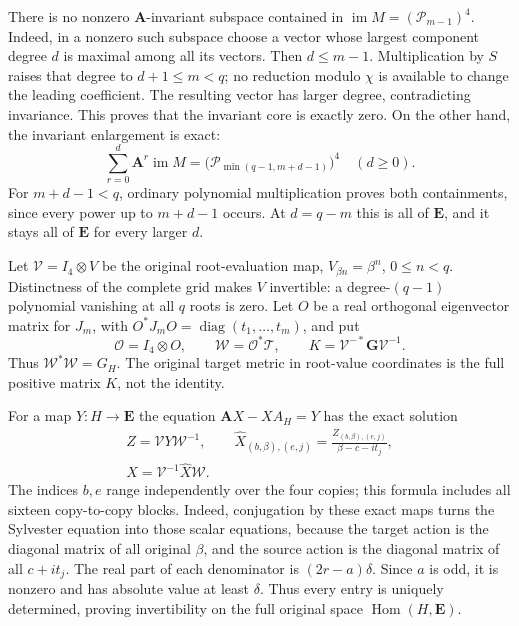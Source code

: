 There is no nonzero \(\mathbf A\)-invariant subspace contained in
\(\operatorname{im}M=(\mathcal P_{m-1})^4\).
Indeed, in a nonzero such subspace choose a vector whose largest
component degree \(d\) is maximal among all its vectors.
Then \(d\leq m-1\).
Multiplication by \(S\) raises that degree to \(d+1\leq m<q\);
no reduction modulo \(\chi\) is available to change the leading
coefficient.
The resulting vector has larger degree, contradicting invariance.
This proves that the invariant core is exactly zero.
On the other hand, the invariant enlargement is exact:
\begin{equation}
 \sum_{r=0}^{d}\mathbf A^r\operatorname{im}M
   =\bigl(\mathcal P_{\min(q-1,m+d-1)}\bigr)^4
 \quad(d\geq0).
 \tag{CJA25}
\end{equation}
For \(m+d-1<q\), ordinary polynomial multiplication proves both
containments, since every power up to \(m+d-1\) occurs.
At \(d=q-m\) this is all of \(\mathbf E\), and it stays all of
\(\mathbf E\) for every larger \(d\).

Let \(\mathcal V=I_4\otimes V\) be the original root-evaluation
map, \(V_{\beta n}=\beta^n\), \(0\leq n<q\).
Distinctness of the complete grid makes \(V\) invertible: a
degree-\((q-1)\) polynomial vanishing at all \(q\) roots is zero.
Let \(O\) be a real orthogonal eigenvector matrix for \(J_m\),
with \(O^*J_mO=\operatorname{diag}(t_1,\ldots,t_m)\), and put
\[
 \mathcal O=I_4\otimes O,\qquad
 \mathcal W=\mathcal O^*\mathcal T,\qquad
 K=\mathcal V^{-*}\mathbf G\mathcal V^{-1}.
 \]
Thus \(\mathcal W^*\mathcal W=G_H\).
The original target metric in root-value coordinates is the full
positive matrix \(K\), not the identity.

For a map \(Y:H\to\mathbf E\) the equation
\(\mathbf AX-XA_H=Y\) has the exact solution
\begin{equation}
 \begin{gathered}
 Z=\mathcal VY\mathcal W^{-1},\qquad
 \widehat X_{(b,\beta),(e,j)}
   =\frac{Z_{(b,\beta),(e,j)}}{\beta-c-it_j},\\
 X=\mathcal V^{-1}\widehat X\mathcal W .
 \end{gathered}
 \tag{CJA26}
\end{equation}
The indices \(b,e\) range independently over the four copies;
this formula includes all sixteen copy-to-copy blocks.
Indeed, conjugation by these exact maps turns the Sylvester equation
into those scalar equations, because the target action is the
diagonal matrix of all original \(\beta\), and the source action is
the diagonal matrix of all \(c+it_j\).
The real part of each denominator is \((2r-a)\delta\).
Since \(a\) is odd, it is nonzero and has absolute value at least
\(\delta\).
Thus every entry is uniquely determined, proving invertibility on
the full original space \(\operatorname{Hom}(H,\mathbf E)\).

